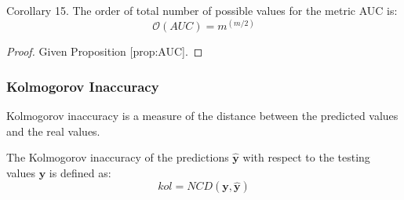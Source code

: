 \begin{corollary}
Corollary 15. The order of total number of possible values for the metric AUC is:
\[
\mathcal{O}\left(AUC\right)=m^{\left(m/2\right)}
\]
\end{corollary}
\begin{proof}
Given Proposition [prop:AUC].
\end{proof}

\subsubsection{Kolmogorov Inaccuracy}

Kolmogorov inaccuracy is a measure of the distance between the predicted values and the real values.

\begin{definition}
The Kolmogorov inaccuracy of the predictions $\hat{\mathbf{y}}$ with respect to the testing values $\mathbf{y}$ is defined as:
\[
kol=NCD(\mathbf{y},\hat{\mathbf{y}})
\]
\end{definition}

